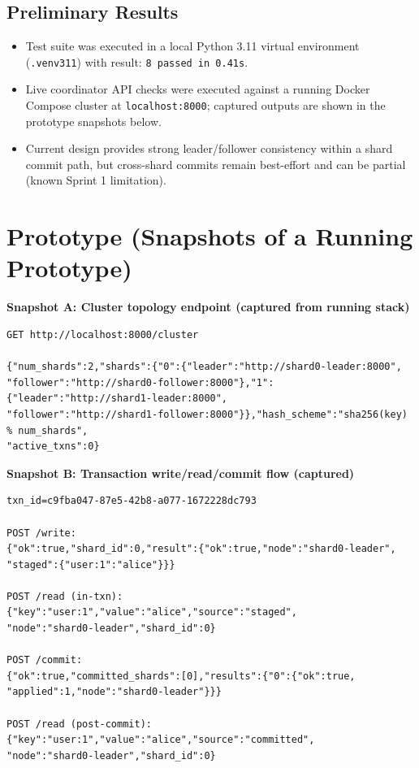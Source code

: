 \documentclass[11pt]{article}
\begin{document}
\subsection*{Preliminary Results}
\begin{itemize}[leftmargin=1.2em]
    \item Test suite was executed in a local Python 3.11 virtual environment (\texttt{.venv311}) with result: \texttt{8 passed in 0.41s}.
    \item Live coordinator API checks were executed against a running Docker Compose cluster at \texttt{localhost:8000}; captured outputs are shown in the prototype snapshots below.
    \item Current design provides strong leader/follower consistency within a shard commit path, but cross-shard commits remain best-effort and can be partial (known Sprint 1 limitation).
\end{itemize}

\section{Prototype (Snapshots of a Running Prototype)}
\textbf{Snapshot A: Cluster topology endpoint (captured from running stack)}
\begin{Verbatim}[fontsize=\small,frame=single]
GET http://localhost:8000/cluster

{"num_shards":2,"shards":{"0":{"leader":"http://shard0-leader:8000",
"follower":"http://shard0-follower:8000"},"1":{"leader":"http://shard1-leader:8000",
"follower":"http://shard1-follower:8000"}},"hash_scheme":"sha256(key) % num_shards",
"active_txns":0}
\end{Verbatim}

\textbf{Snapshot B: Transaction write/read/commit flow (captured)}
\begin{Verbatim}[fontsize=\small,frame=single]
txn_id=c9fba047-87e5-42b8-a077-1672228dc793

POST /write:
{"ok":true,"shard_id":0,"result":{"ok":true,"node":"shard0-leader",
"staged":{"user:1":"alice"}}}

POST /read (in-txn):
{"key":"user:1","value":"alice","source":"staged",
"node":"shard0-leader","shard_id":0}

POST /commit:
{"ok":true,"committed_shards":[0],"results":{"0":{"ok":true,
"applied":1,"node":"shard0-leader"}}}

POST /read (post-commit):
{"key":"user:1","value":"alice","source":"committed",
"node":"shard0-leader","shard_id":0}
\end{Verbatim}
\end{document}
